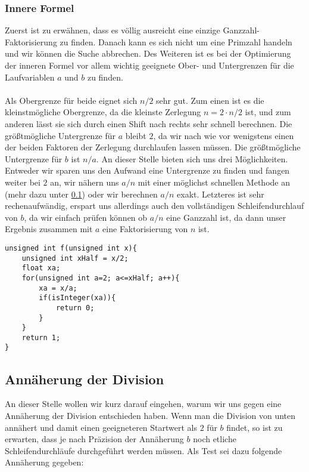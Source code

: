 \documentclass[11pt]{scrartcl}
\begin{document}
\subsubsection{Innere Formel}
\label{Innere Formel}
Zuerst ist zu erwähnen, dass es völlig ausreicht eine einzige Ganzzahl-Faktorisierung zu finden. Danach kann es sich nicht um eine Primzahl handeln und wir können die Suche abbrechen. Des Weiteren ist es bei der Optimierung der inneren Formel vor allem wichtig geeignete Ober- und Untergrenzen für die Laufvariablen $a$ und $b$ zu finden. 

\paragraph{}

Als Obergrenze für beide eignet sich $n/2$ sehr gut. Zum einen ist es die kleinstmögliche Obergrenze, da die kleinste Zerlegung $n=2 \cdot n/2$ ist, und zum anderen lässt sie sich durch einen Shift nach rechts sehr schnell berechnen. Die größtmögliche Untergrenze für $a$ bleibt $2$, da wir nach wie vor wenigstens einen der beiden Faktoren der Zerlegung durchlaufen lassen müssen. Die größtmögliche Untergrenze für $b$ ist $n/a$. An dieser Stelle bieten sich uns drei Möglichkeiten. Entweder wir sparen uns den Aufwand eine Untergrenze zu finden und fangen weiter bei $2$ an, wir nähern uns $a/n$ mit einer möglichst schnellen Methode an (mehr dazu unter \ref{AppxDiv}) oder wir berechnen $a/n$ exakt. Letzteres ist sehr rechenaufwändig, erspart uns allerdings auch den vollständigen Schleifendurchlauf von $b$, da wir einfach prüfen können ob $a/n$ eine Ganzzahl ist, da dann unser Ergebnis zusammen mit $a$ eine Faktorisierung von $n$ ist.

\begin{lstlisting}[frame=single, captionpos=b, label=code-comm-task, xleftmargin=.03\textwidth]
unsigned int f(unsigned int x){
    unsigned int xHalf = x/2;
    float xa;
    for(unsigned int a=2; a<=xHalf; a++){
        xa = x/a;
        if(isInteger(xa)){
            return 0;
        }
    }
    return 1;
}
\end{lstlisting}

\subsection{Annäherung der Division}
\label{AppxDiv}

An dieser Stelle wollen wir kurz darauf eingehen, warum wir uns gegen eine Annäherung der Division entschieden haben. Wenn man die Division von unten annähert und damit einen geeigneteren Startwert als $2$ für $b$ findet, so ist zu erwarten, dass je nach Präzision der Annäherung $b$ noch etliche Schleifendurchläufe durchgeführt werden müssen. Als Test sei dazu folgende Annäherung gegeben:
\end{document}
